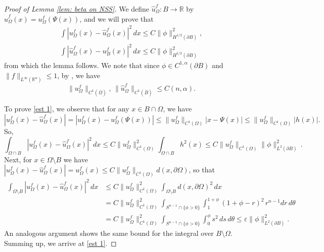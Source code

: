 \documentclass[10pt, reqno]{amsart}
\numberwithin{equation}{section}
\def\R{{\mathbb R}}
\def\e{\varepsilon}
\def\W{\Omega}
\begin{document}
\begin{proof}[Proof of Lemma \ref{lem: beta on NSS}]	
	We define $\hat{u}^f_\W : B\to \R$ by $\hat{u}^f_\W (x) = u^f_\W(\Psi(x))$, and we will prove that 
	\begin{align}
	\label{est 1}	\int |u^f_{\W}(x) - \hat{u}^f_\W (x)|^2 \,dx \leq C \| \phi \|_{H^{1/2}(\partial B)}^2,\\
	\label{est 2}	\int | \hat{u}^f_\W(x) - u^f_B(x)|^2 \, dx \leq C \| \phi \|_{H^{1/2} (\partial B)}^2
	\end{align}
	from which the lemma follows. We note that since $\phi \in C^{1,\alpha}(\partial B)$ and $\| f\|_{L^\infty(\R^n)} \leq 1$, by \cite[Theorem 8.33]{GT}, we have 
    \begin{equation} \label{e:c1est}
       \| u^f_{\W} \|_{C^1(\overline{\W})} , \, \| \hat{u}^f_{\W} \|_{C^1(\overline{B})}
       \leq C(n,\alpha). 
    \end{equation}

 
	
	To prove \eqref{est 1}, we observe that for any $x \in B\cap \W$, we have
	\[
	|u^f_\W(x) - \hat{u}^f_\W(x)| =|u^f_\W(x) - u^f_\W(\Psi(x))|\leq \| u^f_\W\|_{C^1(\W)} | x- \Psi(x)| \le  \| u^f_\W\|_{C^1(\W)} |h(x)|.
	\]
	So, 
	\[
	\int_{\W \cap B}|u^f_\W(x) - \hat{u}^f_\W(x)|^2 \,dx \leq C\| u^f_\W\|^2_{C^1(\W)}  \int_{\W \cap B} h^2(x) \leq  C\| u^f_\W\|_{C^1(\W)}  \| \phi \|_{L^2(\partial B)}^2\,.
	\]
	 Next, for $x \in \W\setminus B$ we have $|u^f_\W(x) - \hat{u}^f_\W(x)| = u^f_\W(x) \leq C\| u^f_\W\|_{C^1(\W)} d(x, \partial \W)$, so that 
	\begin{align*}
		\int_{\W \setminus B} |u^f_\W(x) - \hat{u}^f_\W(x)|^2 \,dx  & \leq C\| u^f_\W\|^2_{C^1(\W)}  \int_{\W \setminus B} d(x, \partial \W)^2 \, dx\\
		 &= C\| u^f_\W\|^2_{C^1(\W)}  \int_{S^{n-1} \cap \{ \phi>0\}} \int_1^{1+ \phi} (1+\phi -r)^2 \,r^{n-1} dr \, d\theta \\
		&=C\| u^f_\W\|^2_{C^1(\W)}  \int_{S^{n-1} \cap \{ \phi>0\}} \int_{0}^\phi s^2 \, ds \, d\theta  \leq \e \| \phi\|_{L^2(\partial B)}^2.
	\end{align*}
	An analogous argument shows the same bound for the integral over $B\setminus \W$. Summing up, we arrive at \eqref{est 1}.
	

\end{proof}
\end{document}
